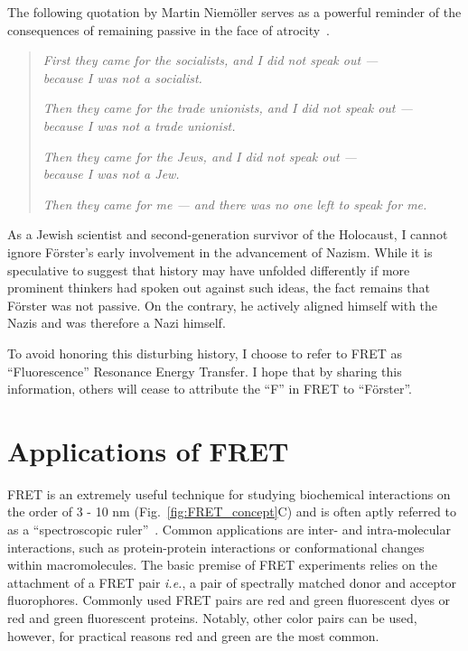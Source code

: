 The following quotation by Martin Niem{\"o}ller serves as a powerful reminder of the consequences of remaining passive in the face of atrocity~\cite{martin_niemoller}. 

\begin{quote}
\centering 
\textit{First they came for the socialists, and I did not speak out — \\
because I was not a socialist.}

\textit{Then they came for the trade unionists, and I did not speak out — \\
because I was not a trade unionist.}

\textit{Then they came for the Jews, and I did not speak out — \\
because I was not a Jew.}

\textit{Then they came for me — and there was no one left to speak for me.}
\end{quote}

As a Jewish scientist and second-generation survivor of the Holocaust, I cannot ignore F{\"o}rster's early involvement in the advancement of Nazism.
While it is speculative to suggest that history may have unfolded differently if more prominent thinkers had spoken out against such ideas, the fact remains that F{\"o}rster was not passive. 
On the contrary, he actively aligned himself with the Nazis and was therefore a Nazi himself. 

To avoid honoring this disturbing history, I choose to refer to FRET as \enquote{Fluorescence} Resonance Energy Transfer. 
I hope that by sharing this information, others will cease to attribute the \enquote{F} in FRET to \enquote{F{\"o}rster}.
 
\section{Applications of FRET
\label{sec:FRET_applications}}

FRET is an extremely useful technique for studying biochemical interactions on the order of 3 - 10 nm (Fig.~\ref{fig:FRET_concept}C) and is often aptly referred to as a \enquote{spectroscopic ruler}~\cite{stryer_PNAS_1967}. 
Common applications are inter- and intra-molecular interactions, such as protein-protein interactions or conformational changes within macromolecules. 
The basic premise of FRET experiments relies on the attachment of a FRET pair \textit{i.e.}, a pair of spectrally matched donor and acceptor fluorophores.
Commonly used FRET pairs are red and green fluorescent dyes or red and green fluorescent proteins. 
Notably, other color pairs can be used, however, for practical reasons red and green are the most common.

